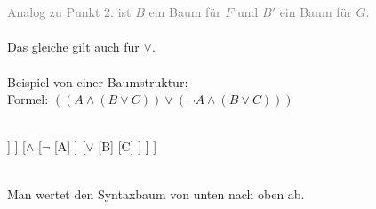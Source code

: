 \documentclass{article}
\begin{document}
\begin{enumerate}
		\\
		\\
		\textcolor{gray}{Analog zu Punkt 2. ist $B$ ein Baum für $F$ und $B'$ ein Baum für $G$.} \\
		\\
		Das gleiche gilt auch für $\vee$. \\
		\\
		Beispiel von einer Baumstruktur: \\
		Formel: $((A\wedge(B\vee C))\vee(\neg A \wedge (B \vee C)))$ \\
		\\
		\begin{forest}
			[ $\vee$ 
			 [$\wedge$ 
			 	[A]
			 	[$\vee$
			 		[B]
			 		[C]
			 	]
			 ]
			 [$\wedge$ 
			 	[$\neg$ 
			 		[A]
			 	]
			 		[$\vee$
			 			[B]
			 			[C]
			 		]
			 ]
			]
		\end{forest}
		\\
		Man wertet den Syntaxbaum von unten nach oben ab.
	\end{enumerate}
\end{document}

